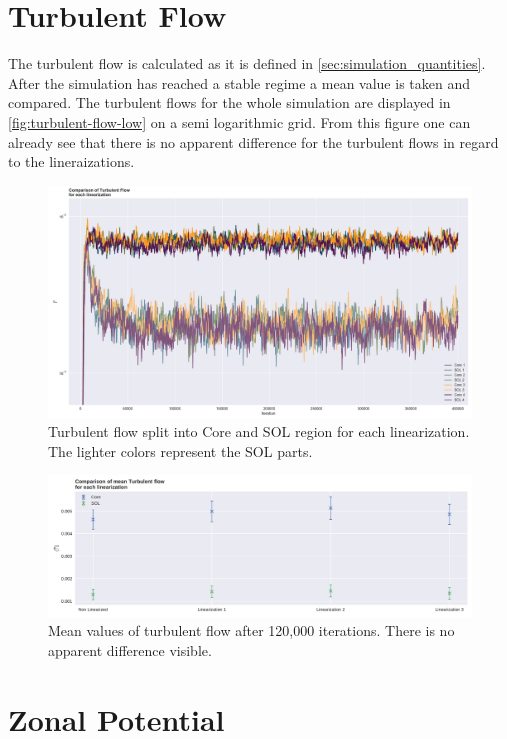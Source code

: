 \documentclass[master.tex]{subfiles}
\begin{document}
\section{Turbulent Flow}
The turbulent flow is calculated as it is defined in \autoref{sec:simulation_quantities}. After the simulation has reached a stable regime a mean value is taken and compared. The turbulent flows for the whole simulation are displayed in \autoref{fig:turbulent-flow-low} on a semi logarithmic grid. From this figure one can already see that there is no apparent difference for the turbulent flows in regard to the lineraizations.

\begin{figure}[!htbp]
    \includegraphics[width=\linewidth]{pdfs/turbulent-flow-low.pdf}
    \caption{Turbulent flow split into Core and \ac{SOL} region for each linearization. The lighter colors represent the \ac{SOL} parts.}
    \label{fig:turbulent-flow-low}
\end{figure}

\begin{figure}[!htbp]
    \includegraphics[widht=\linewidth]{pdfs/turbulent-flow-low-means.pdf}
    \caption{Mean values of turbulent flow after 120,000 iterations. There is no apparent difference visible.}
    \label{fig:turbulent-flow-low-means}
\end{figure}

\section{Zonal Potential}
\end{document}
